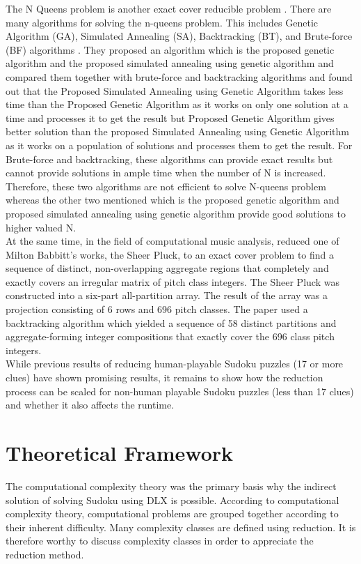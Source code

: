 \documentclass[a4paper,oneside,11pt]{report}
\begin{document}
	The N Queens problem is another exact cover reducible problem \cite{Knuth}. There are many algorithms for solving the n-queens problem. This includes Genetic Algorithm (GA), Simulated Annealing (SA), Backtracking (BT), and Brute-force (BF) algorithms \cite{Mukherjee}. They proposed an algorithm which is the proposed genetic algorithm and the proposed simulated annealing using genetic algorithm and compared them together with brute-force and backtracking algorithms and found out that the Proposed Simulated Annealing using Genetic Algorithm takes less time than the Proposed Genetic Algorithm as it works on only one solution at a time and processes it to get the result but Proposed Genetic Algorithm gives better solution than the proposed Simulated Annealing using Genetic Algorithm as it works on a population of solutions and processes them to get the result. For Brute-force and backtracking, these algorithms can provide exact results but cannot provide solutions in ample time when the number of N is increased. Therefore, these two algorithms are not efficient to solve N-queens problem whereas the other two mentioned which is the proposed genetic algorithm and proposed simulated annealing using genetic algorithm provide good solutions to higher valued N.\\
	
	At the same time, in the field of computational music analysis, \cite{Bemman} reduced one of Milton Babbitt’s works, the Sheer Pluck, to an exact cover problem to find a sequence of distinct, non-overlapping aggregate regions that completely and exactly covers an irregular matrix of pitch class integers. The Sheer Pluck was constructed into a six-part all-partition array. The result of the array was a projection consisting of 6 rows and 696 pitch classes. The paper used a backtracking algorithm which yielded a sequence of 58 distinct partitions and aggregate-forming integer compositions that exactly cover the 696 class pitch integers.\\
	
While previous results of reducing human-playable Sudoku puzzles (17 or more clues) have shown promising results, it remains to show how the reduction process can be scaled for non-human playable Sudoku puzzles (less than 17 clues) and whether it also affects the runtime.

\chapter{Theoretical Framework}
The computational complexity theory was the primary basis why the indirect solution of solving Sudoku using DLX is possible. According to computational complexity theory, computational problems are grouped together according to their inherent difficulty. Many complexity classes are defined using reduction. It is therefore worthy to discuss complexity classes in order to appreciate the reduction method.\\
\end{document}
